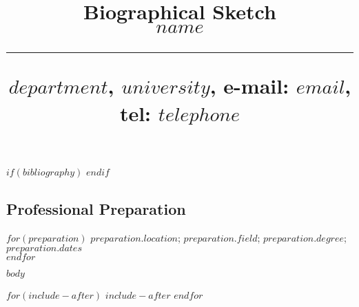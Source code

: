 \documentclass[svgnames,11pt]{article}
\title{%
        \vspace{-2\baselineskip}
            \normalsize
            Biographical Sketch\\
            {\large\textbf{$name$}}\\
            \vspace{0.5\baselineskip}
            \hrule
            \vspace{0.5\baselineskip}
            $department$, $university$, e-mail: \href{mailto:$email$}{$email$}, tel: $telephone$
        \vspace{-1.5ex}
        }
\begin{document}
$if(bibliography)$
$endif$


\maketitle
\vspace{-4\baselineskip}


\subsection{Professional Preparation}

  $for(preparation)$
      $preparation.location$; $preparation.field$; $preparation.degree$; $preparation.dates$ \\
  $endfor$



$body$



$for(include-after)$
  $include-after$
$endfor$
\end{document}
